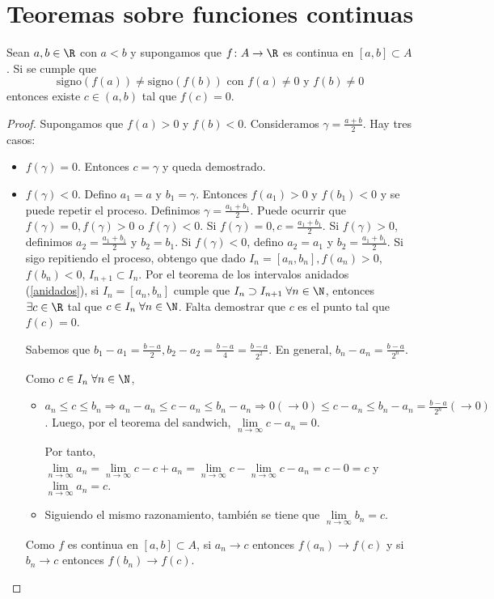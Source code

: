 \section{Teoremas sobre funciones continuas}
\begin{theorem}[de Bolzano]
	Sean \(a,b \in \R \) con \(a < b \) y supongamos que \(f \colon A \to \R \) es continua en \([a,b] \subset A \). Si se cumple que
	\[
		\text{signo}(f(a)) \neq \text{signo}(f(b)) \text{ con } f(a) \neq 0 \text{ y } f(b) \neq 0
	\]
	entonces existe \(c \in (a,b )\) tal que \(f(c) = 0 \).
\end{theorem}
\begin{proof}
	Supongamos que \(f(a) > 0 \) y \(f(b) < 0\). Consideramos \(\gamma = \frac{a + b}{2}\). Hay tres casos:
	\begin{itemize}
		\item \(f(\gamma) = 0\). Entonces \(c = \gamma\) y queda demostrado.
		\item \(f(\gamma) < 0 \). Defino \(a_1 = a \) y \(b_1 = \gamma\). Entonces \(f(a_1) >0 \) y \(f(b_1) < 0 \) y se puede repetir el proceso. Definimos \(\gamma = \frac{a_1 + b_1 }{2 }\). Puede ocurrir que \(f(\gamma) = 0, f(\gamma) > 0 \) o \(f(\gamma) < 0 \). Si \(f(\gamma) = 0, c = \frac{a_1 + b_1}{2}\). Si \(f(\gamma) > 0 \), definimos \(a_2 = \frac{a_1 + b_1 }{2 }\) y \(b_2 = b_1\). Si \(f(\gamma) < 0 \), defino \(a_2 = a_1 \) y \(b_2 = \frac{a_1 + b_1 }{2 }\). Si sigo repitiendo el proceso, obtengo que dado \(I_n = [a_n,b_n], f(a_n) > 0 \), \(f(b_n) < 0 \), \(I_{n+1} \subset I_n \). Por el teorema de los intervalos anidados (\ref{anidados}), si \(I_n = [a_n,b_n ]\) cumple que \(I_n \supset I_{n+1} \; \forall n \in \N \), entonces \(\exists c \in \R \) tal que \(c \in I_n \; \forall  n \in \N \). Falta demostrar que \(c \) es el punto tal que \(f(c) = 0\).

		      Sabemos que \(b_1 - a_1 = \frac{b - a }{2}, b_2 - a_2 = \frac{b - a }{4} = \frac{b - a }{2^{2} }\). En general, \(b_n - a_n = \frac{b - a }{2^{n} }\).

		      Como \(c \in I_n \;\forall n \in \N \),
		      \begin{itemize}
			      \item \(a_n \leq c \leq b_n \Rightarrow a_n - a_n \leq c - a_n \leq b_n - a_n \Rightarrow 0(\rightarrow 0) \leq c - a_n \leq b_n - a_n = \frac{b - a }{2^{n} }(\rightarrow 0)\). Luego, por el teorema del sandwich, \(\lim\limits_{n \to \infty} c - a_n = 0 \).

			            Por tanto, \(\lim\limits_{n \to \infty} a_n = \lim\limits_{n \to \infty} c - c + a_n = \lim\limits_{n \to \infty} c - \lim\limits_{n \to \infty} c - a_n = c - 0 = c \) y \(\lim\limits_{n \to \infty} a_n = c \).
			      \item Siguiendo el mismo razonamiento, también se tiene que \(\lim\limits_{n \to \infty} b_n = c \).
		      \end{itemize}
		      Como \(f \) es continua en \([a,b] \subset A \), si \(a_n \rightarrow c \) entonces \(f(a_n) \rightarrow f(c )\) y si \(b_n \rightarrow c \) entonces \(f(b_n) \rightarrow f(c )\).


\end{itemize}
\end{proof}
